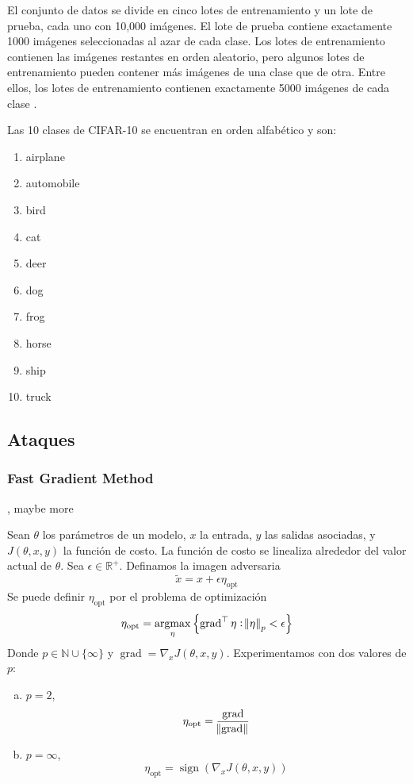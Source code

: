 El conjunto de datos se divide en cinco lotes de entrenamiento y un lote de prueba, cada uno con 10,000 imágenes. El lote de prueba contiene exactamente 1000 imágenes seleccionadas al azar de cada clase. Los lotes de entrenamiento contienen las imágenes restantes en orden aleatorio, pero algunos lotes de entrenamiento pueden contener más imágenes de una clase que de otra. Entre ellos, los lotes de entrenamiento contienen exactamente 5000 imágenes de cada clase \cite{cifarsite}. 

Las 10 clases de CIFAR-10 se encuentran en orden alfabético y son:
\begin{multicols}{5}
\begin{enumerate}
    \item airplane
    \item automobile
    \item bird
    \item cat
    \item deer
    \item dog
    \item frog
    \item horse
    \item ship
    \item truck
\end{enumerate}
\end{multicols}


\subsection{Ataques}

\subsubsection{Fast Gradient Method}
\cite{goodfellow2015explaining}, maybe more

Sean $\theta$ los parámetros de un modelo, $x$ la entrada, $y$ las salidas asociadas, y $J(\theta, x, y)$ la función de costo. La función de costo se linealiza alrededor del valor actual de $\theta$. Sea $\epsilon \in \mathbb{R}^+$. Definamos la imagen adversaria 
\[\tilde{x} = x + \epsilon \eta_{\text{opt}}\]
Se puede definir $\eta_{\text{opt}}$ por el problema de optimización
\[\eta_{\text{opt}} = \operatornamewithlimits{argmax}_{\eta}\left\{ \operatorname{grad} ^\top \eta: \norm{\eta}_p< \epsilon\right\}\]
Donde $p \in \mathbb{N} \cup \{\infty\}$ y $\operatorname{grad} = \nabla_x J(\theta, x, y)$. Experimentamos con dos valores de $p$:
\begin{enumerate}[a)]
    \item $p = 2$,
    \[\eta_{\text{opt}} = \frac{\operatorname{grad}}{\norm{\operatorname{grad}}}\]
    \item $p = \infty$,
    \[\eta_{\text{opt}} = \operatorname{sign}(\nabla_x J(\theta, x, y))\]
\end{enumerate}


